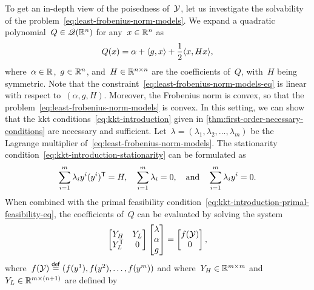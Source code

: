 To get an in-depth view of the poisedness of~$\xpt$, let us investigate the solvability of the problem~\cref{eq:least-frobenius-norm-models}.
We expand a quadratic polynomial~$Q \in \mathscr{Q}(\mathbb{R}^n)$ for any~$x \in \mathbb{R}^n$ as
\begin{equation*}
    Q(x) = \alpha + \langle g, x\rangle + \frac{1}{2} \langle x, Hx\rangle,
\end{equation*}
where~$\alpha \in \mathbb{R}$,~$g \in \mathbb{R}^n$, and~$H \in \mathbb{R}^{n \times n}$ are the coefficients of~$Q$, with~$H$ being symmetric.
Note that the constraint~\cref{eq:least-frobenius-norm-models-eq} is linear with respect to~$(\alpha, g, H)$.
Moreover, the Frobenius norm is convex, so that the problem~\cref{eq:least-frobenius-norm-models} is convex.
In this setting, we can show that the \gls{kkt} conditions~\cref{eq:kkt-introduction} given in \cref{thm:first-order-necessary-conditions} are necessary and sufficient.
Let~$\lambda = (\lambda_1, \lambda_2, \dots, \lambda_m)$ be the Lagrange multiplier of~\cref{eq:least-frobenius-norm-models}.
The stationarity condition~\cref{eq:kkt-introduction-stationarity} can be formulated as
\begin{equation*}
    \sum_{i = 1}^m \lambda_i y^i (y^i)^{\mathsf{T}} = H, \quad \sum_{i = 1}^m \lambda_i = 0, \quad \text{and} \quad \sum_{i = 1}^m \lambda_i y^i = 0.
\end{equation*}
When combined with the primal feasibility condition~\cref{eq:kkt-introduction-primal-feasibility-eq}, the coefficients of~$Q$ can be evaluated by solving the system
\begin{equation}
    \label{eq:least-frobenius-kkt-system}
    \begin{bmatrix}
        Y_H         & Y_L\\
        Y_L^{\T}    & 0
    \end{bmatrix}
    \begin{bmatrix}
        \lambda\\
        \alpha\\
        g
    \end{bmatrix}
    =
    \begin{bmatrix}
        \obj(\xpt)\\
        0
    \end{bmatrix},
\end{equation}
where~$\obj(\xpt) \eqdef (\obj(y^1), \obj(y^2), \dots, \obj(y^m))$ and where~$Y_H \in \mathbb{R}^{m \times m}$ and~$Y_L \in \mathbb{R}^{m \times (n + 1)}$ are defined by

